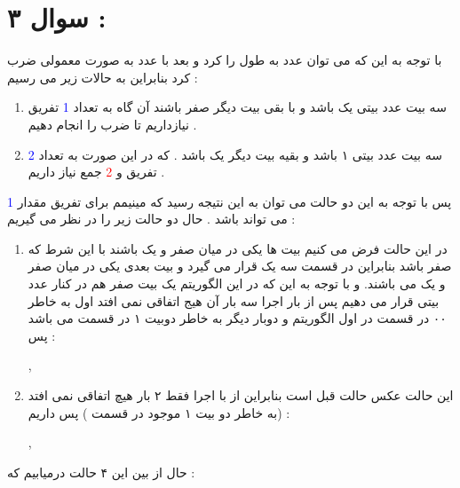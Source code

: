 \documentclass{article}
\begin{document}
\section*{سوال ۳ : }
با توجه به این که می توان عدد به طول 
را 
کرد و بعد با عدد 
به صورت معمولی ضرب کرد بنابراین به حالات زیر می رسیم : 
\begin{center}
	\begin{enumerate}
		\item  سه بیت 
		عدد 
		بیتی یک باشد و با بقی 
		بیت دیگر صفر باشند آن گاه به تعداد 
		\textcolor{blue}{1}
		تفریق نیازداریم تا ضرب را انجام دهیم . 
		\item سه بیت 
		عدد 
		بیتی ۱ باشد و بقیه 
		بیت دیگر یک باشد  . که در این صورت به  تعداد 
		\textcolor{blue}{2}
		تفریق و 
		\textcolor{red}{2}
		جمع نیاز داریم   .  
	\end{enumerate}

\end{center}
پس با توجه به این دو حالت می توان به این نتیجه رسید که مینیمم برای تفریق مقدار
\textcolor{blue}{1}
 می تواند باشد . حال دو حالت زیر را در نظر می گیریم  : 
\begin{center}
	\begin{enumerate}
		\item در این حالت فرض می کنیم بیت ها یکی در میان صفر و یک باشند با این شرط که 
		صفر باشد بنابراین در قسمت 
	سه یک قرار می گیرد و 
	بیت بعدی یکی در میان صفر و یک می باشند. و با توجه به این که در این الگوریتم یک بیت صفر هم در کنار 
	عدد 
	بیتی قرار می دهیم پس از 
	بار اجرا سه بار آن هیج اتفاقی نمی افتد اول به خاطر ۰۰ در قسمت  
	در اول الگوریتم و دوبار دیگر به خاطر دوبیت ۱ در قسمت 
	می باشد پس  : 
	\begin{center}
		 , 
	\end{center}
\item این حالت عکس حالت قبل است بنابراین از 
با اجرا فقط ۲ بار هیچ اتفاقی نمی افتد (به خاطر دو بیت ۱ موجود در قسمت 
)
پس داریم : 
\begin{center}
	 , 
	
\end{center}
	\end{enumerate}
\end{center}
حال از بین این ۴ حالت درمیابیم که  : 
\begin{center}
\end{center}
\end{document}

